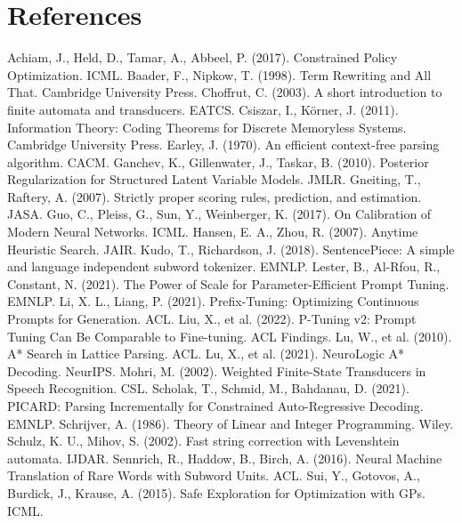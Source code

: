 \documentclass{article}
\begin{document}
\section*{References}
\begin{thebibliography}{99}
Achiam, J., Held, D., Tamar, A., Abbeel, P. (2017). Constrained Policy Optimization. ICML.
Baader, F., Nipkow, T. (1998). Term Rewriting and All That. Cambridge University Press.
Choffrut, C. (2003). A short introduction to finite automata and transducers. EATCS.
Csiszar, I., K\"orner, J. (2011). Information Theory: Coding Theorems for Discrete Memoryless Systems. Cambridge University Press.
Earley, J. (1970). An efficient context-free parsing algorithm. CACM.
Ganchev, K., Gillenwater, J., Taskar, B. (2010). Posterior Regularization for Structured Latent Variable Models. JMLR.
Gneiting, T., Raftery, A. (2007). Strictly proper scoring rules, prediction, and estimation. JASA.
Guo, C., Pleiss, G., Sun, Y., Weinberger, K. (2017). On Calibration of Modern Neural Networks. ICML.
Hansen, E. A., Zhou, R. (2007). Anytime Heuristic Search. JAIR.
Kudo, T., Richardson, J. (2018). SentencePiece: A simple and language independent subword tokenizer. EMNLP.
Lester, B., Al-Rfou, R., Constant, N. (2021). The Power of Scale for Parameter-Efficient Prompt Tuning. EMNLP.
Li, X. L., Liang, P. (2021). Prefix-Tuning: Optimizing Continuous Prompts for Generation. ACL.
Liu, X., et al. (2022). P-Tuning v2: Prompt Tuning Can Be Comparable to Fine-tuning. ACL Findings.
Lu, W., et al. (2010). A* Search in Lattice Parsing. ACL.
Lu, X., et al. (2021). NeuroLogic A* Decoding. NeurIPS.
Mohri, M. (2002). Weighted Finite-State Transducers in Speech Recognition. CSL.
Scholak, T., Schmid, M., Bahdanau, D. (2021). PICARD: Parsing Incrementally for Constrained Auto-Regressive Decoding. EMNLP.
Schrijver, A. (1986). Theory of Linear and Integer Programming. Wiley.
Schulz, K. U., Mihov, S. (2002). Fast string correction with Levenshtein automata. IJDAR.
Sennrich, R., Haddow, B., Birch, A. (2016). Neural Machine Translation of Rare Words with Subword Units. ACL.
Sui, Y., Gotovos, A., Burdick, J., Krause, A. (2015). Safe Exploration for Optimization with GPs. ICML.

\end{thebibliography}
\end{document}
